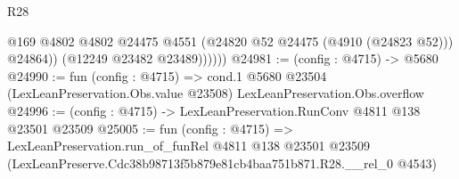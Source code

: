 \begin{lexlean}{R28}
\begin{coremodule}
                  @169
                  @4802
                  @4802
                  @24475
                  @4551
                  (@24820 @52 @24475 (@4910 (@24823 @52)))
                  @24864))
              (@12249 @23482 @23489))))))
@24981 := (config : @4715) -> @5680
@24990 := fun (config : @4715) =>
  cond.{1} @5680 @23504 (LexLeanPreservation.Obs.value @23508) LexLeanPreservation.Obs.overflow
@24996 := (config : @4715) -> LexLeanPreservation.RunConv @4811 @138 @23501 @23509
@25005 := fun (config : @4715) =>
  LexLeanPreservation.run_of_funRel
    @4811
    @138
    @23501
    @23509
    (LexLeanPreserve.Cdc38b98713f5b879e81cb4baa751b871.R28.__rel_0 @4543)
\end{coremodule}
\end{lexlean}
